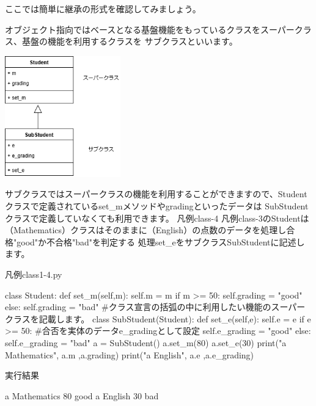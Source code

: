 ここでは簡単に継承の形式を確認してみましょう。

オブジェクト指向ではベースとなる基盤機能をもっているクラスをスーパークラス、基盤の機能を利用するクラスを
サブクラスといいます。
\begin{center}
\includegraphics[width=5cm]{images/ClassExtends.png}
\end{center}

サブクラスではスーパークラスの機能を利用することができますので、Studentクラスで定義されているset\_mメソッドやgradingといったデータは
SubStudentクラスで定義していなくても利用できます。
\newpage
{\gt 凡例class-4}
凡例class-3のStudentは（Mathematics）クラスはそのままに（English）の点数のデータを処理し合格"good"か不合格"bad"を判定する
処理set\_eをサブクラスSubStudentに記述します。

{\gt 凡例class1-4.py}
\begin{listing}{1}
class Student: 
    def set_m(self,m):
        self.m = m
        if m >= 50:
            self.grading = "good"
        else:
            self.grading = "bad"
#クラス宣言の括弧の中に利用したい機能のスーパークラスを記載します。
class SubStudent(Student): 
    def set_e(self,e):
        self.e = e
        if e >= 50:
            #合否を実体のデータe_gradingとして設定
            self.e_grading = "good"
        else:
            self.e_grading = "bad"
a = SubStudent()
a.set_m(80)
a.set_e(30)
print("a Mathematics", a.m ,a.grading)
print("a English", a.e ,a.e_grading)
\end{listing}
実行結果
\begin{listing}{1}
a  Mathematics 80 good
a  English 30 bad
\end{listing}





